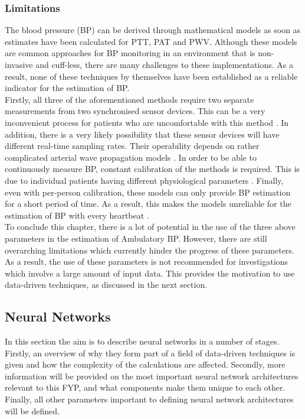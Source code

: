\subsubsection{Limitations}
The blood pressure (BP) can be derived through mathematical models as 
soon as estimates have been calculated for PTT, PAT and PWV. Although 
these models are common approaches for BP monitoring in an environment 
that is non-invasive and cuff-less, there are many challenges to these 
implementations. As a result, none of these techniques by themselves 
have been established as a reliable indicator for the estimation 
of BP. \\ \newline \noindent Firstly, all three of the aforementioned 
methods require two separate measurements from two synchronised sensor 
devices. This can be a very inconvenient process for patients who are
uncomfortable with this method \cite{Jeong2021}. In 
addition, there is a very likely possibility that these sensor devices 
will have different real-time sampling rates. Their operability depends 
on rather complicated arterial wave propagation 
models \cite{ElHajj2020}. In order to be able to 
continuously measure BP, constant calibration of the methods is 
required. This is due to individual patients having different 
physiological parameters \cite{Jeong2021}. Finally, 
even with per-person calibration, these models can only provide BP 
estimation for a short period of time. As a result, this makes the 
models unreliable for the estimation of BP with every 
heartbeat \cite{ElHajj2020}. \\ \newline \noindent To conclude this 
chapter, there is a lot of potential in the use of the three above 
parameters in the estimation of Ambulatory BP. However, there are still 
overarching limitations which currently hinder the progress of these 
parameters. As a result, the use of these parameters is not recommended for investigations which 
involve a large amount of input data. This provides the motivation to use data-driven techniques, as discussed in the next 
section.




 \subsection{Neural Networks}

 In this section the aim is to describe neural networks in a number of stages. Firstly, an overview of why they form part of a field 
 of data-driven techniques is given and how the complexity of the calculations are affected. Secondly, more information will be provided on the most important neural network architectures relevant to this FYP, and what components 
 make them unique to each other. Finally, all other parameters important to defining neural network architectures will be defined.

